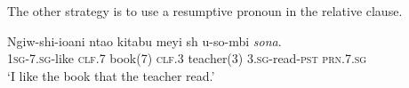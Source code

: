 The other strategy is to use a resumptive pronoun in the relative clause.

\begin{exe}
\ex
\gll Ngiw-shi-ioani nta\textbeltl o kitabu meyi {sh\textramshorns} u-so-mbi \textit{sona}. \\
\textsc{1sg}-\textsc{7.sg}-like \textsc{clf.7} book(7) \textsc{clf.3} teacher(3) \textsc{3.sg}-read-\textsc{pst} \textsc{prn.7.sg} \\
\trans `I like the book that the teacher read.'
\end{exe}
